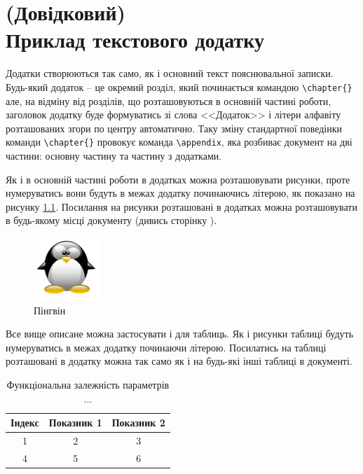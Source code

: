 \chapter[(Довідковий) Приклад текстового додатку]{(Довідковий)\\ Приклад текстового додатку}
\label{apdx:text}

Додатки створюються так само, як і основний текст пояснювальної записки. Будь-який додаток -- це окремий розділ, який
починається командою \verb|\chapter{}| але, на відміну від розділів, що розташовуються в основній частині роботи, заголовок
додатку буде формуватись зі слова <<Додаток>>  і літери алфавіту розташованих згори по центру автоматично. Таку зміну
стандартної поведінки команди \verb|\chapter{}| провокує команда \verb|\appendix|, яка розбиває документ на дві частини: 
основну частину та частину з додатками.


Як і в основній частині роботи в додатках можна розташовувати рисунки, проте нумеруватись вони будуть в межах додатку
починаючись літерою, як показано на рисунку \ref{apdxfig:tux}. Посилання на рисунки розташовані в додатках можна розташовувати 
в будь-якому місці документу (дивись сторінку \pageref{linkpage}).


\begin{figure}[h]
 \centering\includegraphics{img/Tux.png}
 \caption{Пінгвін}
 \label{apdxfig:tux}
\end{figure}

Все вище описане можна застосувати і для таблиць. Як і рисунки таблиці будуть нумеруватись в межах додатку починаючи літерою.
Посилатись на таблиці розташовані в додатку можна так само як і на будь-які інші таблиці в документі. 

\begin{table}[h]
\caption{\label{apdxtable:1}Функціональна залежність параметрів ...}
 \begin{tabular}{|c|c|c|}
 \hline 
 Індекс & Показник 1 & Показник 2\tabularnewline
 \hline\hline 
 1      & 2          & 3         \tabularnewline
 \hline
 4      & 5          & 6         \tabularnewline
 \hline 
\end{tabular}
\end{table}
  


